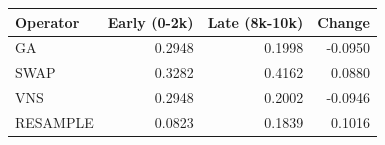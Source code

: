 \begin{tabular}{lrrr}
\toprule
Operator & Early (0-2k) & Late (8k-10k) & Change \\
\midrule
GA & 0.2948 & 0.1998 & -0.0950 \\
SWAP & 0.3282 & 0.4162 & 0.0880 \\
VNS & 0.2948 & 0.2002 & -0.0946 \\
RESAMPLE & 0.0823 & 0.1839 & 0.1016 \\
\bottomrule
\end{tabular}
